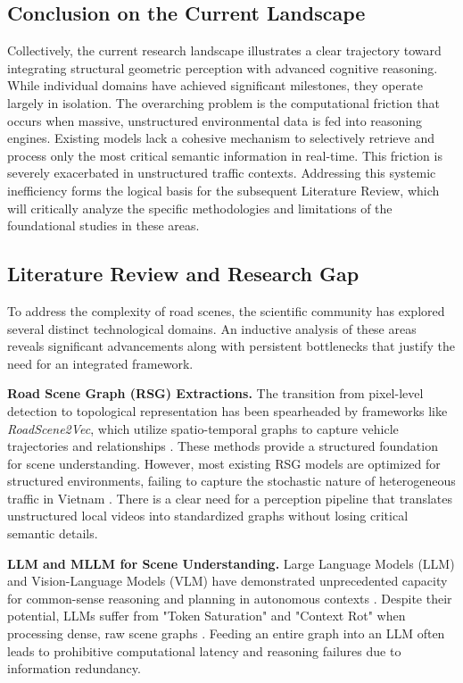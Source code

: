\documentclass[a4paper, 12pt]{article}
\begin{document}
	
	
	\subsection{Conclusion on the Current Landscape}
	Collectively, the current research landscape illustrates a clear trajectory toward integrating structural geometric perception with advanced cognitive reasoning. While individual domains have achieved significant milestones, they operate largely in isolation. The overarching problem is the computational friction that occurs when massive, unstructured environmental data is fed into reasoning engines. Existing models lack a cohesive mechanism to selectively retrieve and process only the most critical semantic information in real-time. This friction is severely exacerbated in unstructured traffic contexts. Addressing this systemic inefficiency forms the logical basis for the subsequent Literature Review, which will critically analyze the specific methodologies and limitations of the foundational studies in these areas.
	
	\subsection{Literature Review and Research Gap}
	To address the complexity of road scenes, the scientific community has explored several distinct technological domains. An inductive analysis of these areas reveals significant advancements along with persistent bottlenecks that justify the need for an integrated framework.
	
	\textbf{Road Scene Graph (RSG) Extractions.} The transition from pixel-level detection to topological representation has been spearheaded by frameworks like \textit{RoadScene2Vec}, which utilize spatio-temporal graphs to capture vehicle trajectories and relationships \cite{roadscene2vec2024, li2022spatio}. These methods provide a structured foundation for scene understanding. However, most existing RSG models are optimized for structured environments, failing to capture the stochastic nature of heterogeneous traffic in Vietnam \cite{tian2025query, wen2023dilu}. There is a clear need for a perception pipeline that translates unstructured local videos into standardized graphs without losing critical semantic details.
	
	\textbf{LLM and MLLM for Scene Understanding.} Large Language Models (LLM) and Vision-Language Models (VLM) have demonstrated unprecedented capacity for common-sense reasoning and planning in autonomous contexts \cite{wang2025vlmlight, fu2024drivelm}. Despite their potential, LLMs suffer from "Token Saturation" and "Context Rot" when processing dense, raw scene graphs \cite{fan2025minirag, zhang2026recursive, hong2025contextrot}. Feeding an entire graph into an LLM often leads to prohibitive computational latency and reasoning failures due to information redundancy.
	
\end{document}
